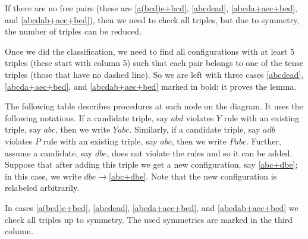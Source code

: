 \documentclass{article}
\begin{document}
If there are no free pairs (these are \ref{a(bcd)e+bcd}, \ref{abcdead}, \ref{abcda+aec+bed}, and \ref{abcdab+aec+bed}),
then we need to check all triples,
but due to symmetry, the number of triples can be reduced.

Once we did the classification, we need to find all configurations with at least 5 triples (these start with column 5)
such that each pair belongs to one of the tense triples (those that have no dashed line).
So we are left with three cases \ref{abcdead}, \ref{abcda+aec+bed}, and \ref{abcdab+aec+bed} marked in bold;
it proves the lemma.

The following table describes procedures at each node on the diagram.
It uses the following notations.
If a candidate triple, say $abd$ violates $Y$ rule with an existing triple, say $abc$, then we write $Yabc$.
Similarly, if a candidate triple, say $adb$ violates $P$ rule with an existing triple, say $abc$, then we write $Pabc$.
Further, assume a candidate, say $dbe$, does not violate the rules and so it can be added.
Suppose that after adding this triple we get a new configuration, say \ref{abc+dbe};
in this case, we write $dbe{\to}$\ref{abc+dbe}.
Note that the new configuration is relabeled arbitrarily.

In cases \ref{a(bcd)e+bcd}, \ref{abcdead}, \ref{abcda+aec+bed}, and \ref{abcdab+aec+bed} we check all triples up to symmetry.
The used symmetries are marked in the third column.


\setcounter{foo}{0}
\newcommand{\myitem}{\refstepcounter{foo}\thefoo}
\end{document}
